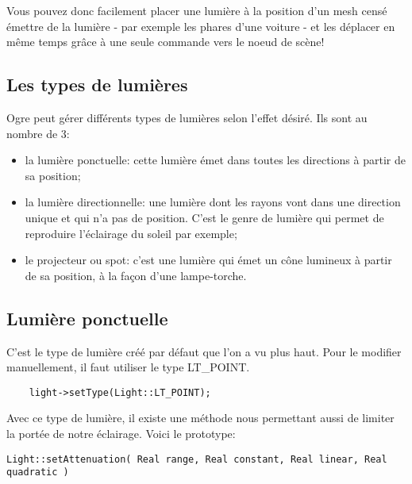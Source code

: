 \documentclass[10pt,a4paper]{report}
\begin{document}
Vous pouvez donc facilement placer une lumi\`ere \`{a} la position d'un mesh cens\'e \'emettre de la lumi\`ere - par exemple les phares d'une voiture - et les d\'eplacer en m\^eme temps gr\^{a}ce \`{a} une seule commande vers le noeud de sc\`ene!





\subsection{Les types de lumi\`eres}

Ogre peut g\'erer diff\'erents types de lumi\`eres selon l'effet d\'esir\'e. Ils sont au nombre de 3:

\begin{itemize}
\item la lumi\`ere ponctuelle: cette lumi\`ere \'emet dans toutes les directions \`{a} partir de sa position;
\item la lumi\`ere directionnelle: une lumi\`ere dont les rayons vont dans une direction unique et qui n'a pas de position. C'est le genre de lumi\`ere qui permet de reproduire l'\'eclairage du soleil par exemple;
\item le projecteur ou spot: c'est une lumi\`ere qui \'emet un c\^one lumineux \`{a} partir de sa position, \`{a} la fa\c{c}on d'une lampe-torche.
\end{itemize}
    




\subsection{Lumi\`ere ponctuelle}
C'est le type de lumi\`ere cr\'e\'e par d\'efaut que l'on a vu plus haut. Pour le modifier manuellement, il faut utiliser le type LT\_POINT.

\begin{lstlisting}
	light->setType(Light::LT_POINT);
\end{lstlisting}


Avec ce type de lumi\`ere, il existe une m\'ethode nous permettant aussi de limiter la port\'ee de notre \'eclairage. Voici le prototype:
\begin{lstlisting}
Light::setAttenuation( Real range, Real constant, Real linear, Real quadratic )
\end{lstlisting}
\end{document}

